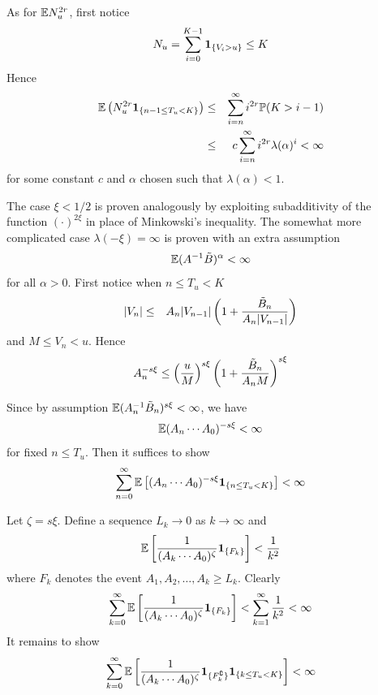 \documentclass{beamer}
\begin{document}
\begin{frame}
  As for $\mathbb{E} N_u^{2r}$, first notice
  \[
  N_u = \sum_{i=0}^{K-1} \mathbf{1}_{\{V_i > u\}} \leq K
  \]
  Hence
  \begin{eqnarray*}
    \mathbb{E} \left(N_u^{2r}\mathbf{1}_{\{n-1 \leq T_u < K\}}\right) &\leq& \sum_{i=n}^\infty i^{2r}
    \mathbb{P}(K > i-1) \\
    &\leq& c \sum_{i=n}^\infty i^{2r} \lambda(\alpha)^i < \infty
  \end{eqnarray*}
  for some constant $c$ and $\alpha$ chosen such that $\lambda(\alpha)
  < 1$.
\end{frame}

\begin{frame}
  The case $\xi < 1/2$ is proven analogously by exploiting
  subadditivity of the function $(\cdot)^{2\xi}$ in place of
  Minkowski's inequality. The somewhat more complicated case
  $\lambda(-\xi) = \infty$ is proven with an extra assumption
  \[
  \mathbb{E} (A^{-1} \tilde B)^\alpha < \infty
  \]
  for all $\alpha > 0$. First notice when $n \leq T_u < K$
  \begin{eqnarray*}
    |V_n| &\leq& A_n |V_{n-1}| \left(
      1 + {
        \tilde B_n
        \over
        A_n |V_{n-1}|
      }
    \right)
  \end{eqnarray*}
  and $M \leq V_n < u$. Hence
  \[
  A_n^{-s\xi} \leq \left(
    {
      u \over M
    }
    \right)^{s\xi} 
    \left(
    1 + {
      \tilde B_n
      \over
      A_n M
    }
  \right)^{s\xi}
  \]
\end{frame}

\begin{frame}
  Since by assumption $\mathbb{E} (A_n^{-1} \tilde B_n)^{s\xi} < \infty$, we
  have
  \[
  \mathbb{E} (A_{n} \cdots A_0)^{-s\xi} < \infty
  \]
  for fixed $n \leq T_u$. Then it suffices to show
  \[
  \sum_{n=0}^\infty
    \mathbb{E} \left[
      (A_n \cdots A_0)^{-s\xi} \mathbf{1}_{\{n \leq T_u < K\}}
    \right] < \infty
  \]
\end{frame}

\begin{frame}
  Let $\zeta = s \xi$. Define a sequence $L_k \to 0$ as $k \to \infty$
  and
  \[
  \mathbb{E} \left[
    {
      1 \over
      (A_k \cdots A_0)^\zeta
    }  \mathbf{1}_{\{F_k\}}\right] < {1 \over k^2}
  \]
  where $F_k$ denotes the event $A_1, A_2, \dots, A_{k} \geq
  L_k$. Clearly
  \[
  \sum_{k=0}^\infty  \mathbb{E} \left[
    {
      1 \over
      (A_k \cdots A_0)^\zeta
    }  \mathbf{1}_{\{F_k\}} \right]
  <  \sum_{k=1}^\infty {1 \over k^2} < \infty
  \]
  It remains to show
  \[
  \sum_{k=0}^\infty  \mathbb{E} \left[
    {
      1 \over
      (A_k \cdots A_0)^\zeta
    }  \mathbf{1}_{\{F_k^\complement\}} \mathbf{1}_{\{k \leq T_u < K\}} \right] < \infty
  \]
\end{frame}
\end{document}
